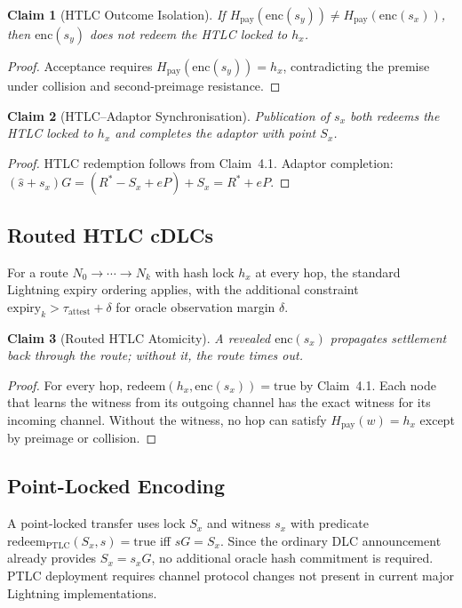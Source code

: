 \documentclass[11pt,a4paper]{article}
\theoremstyle{claimstyle}
\newtheorem{claim}{Claim}[section]
\begin{document}
\begin{claim}[HTLC Outcome Isolation]
If $H_{\mathrm{pay}}(\mathrm{enc}(s_y)) \neq H_{\mathrm{pay}}(\mathrm{enc}(s_x))$,
then $\mathrm{enc}(s_y)$ does not redeem the HTLC locked to $h_x$.
\end{claim}
\begin{proof}
Acceptance requires $H_{\mathrm{pay}}(\mathrm{enc}(s_y)) = h_x$, contradicting
the premise under collision and second-preimage resistance.
\end{proof}

\begin{claim}[HTLC--Adaptor Synchronisation]
Publication of $s_x$ both redeems the HTLC locked to $h_x$ and completes the
adaptor with point $S_x$.
\end{claim}
\begin{proof}
HTLC redemption follows from Claim~4.1. Adaptor completion: $(\hat{s}+s_x)G =
(R^*-S_x+eP)+S_x = R^*+eP$.
\end{proof}

\subsection{Routed HTLC cDLCs}

For a route $N_0 \to \cdots \to N_k$ with hash lock $h_x$ at every hop, the
standard Lightning expiry ordering applies, with the additional constraint
$\mathrm{expiry}_k > \tau_{\mathrm{attest}} + \delta$ for oracle observation
margin $\delta$.

\begin{claim}[Routed HTLC Atomicity]
A revealed $\mathrm{enc}(s_x)$ propagates settlement back through the route;
without it, the route times out.
\end{claim}
\begin{proof}
For every hop, $\mathrm{redeem}(h_x, \mathrm{enc}(s_x)) = \mathrm{true}$ by
Claim~4.1. Each node that learns the witness from its outgoing channel has the
exact witness for its incoming channel. Without the witness, no hop can satisfy
$H_{\mathrm{pay}}(w) = h_x$ except by preimage or collision.
\end{proof}

\subsection{Point-Locked Encoding}

A point-locked transfer uses lock $S_x$ and witness $s_x$ with predicate
$\mathrm{redeem}_{\mathrm{PTLC}}(S_x, s) = \mathrm{true}$ iff $sG = S_x$.
Since the ordinary DLC announcement already provides $S_x = s_x G$, no
additional oracle hash commitment is required. PTLC deployment requires channel
protocol changes not present in current major Lightning implementations.
\end{document}
